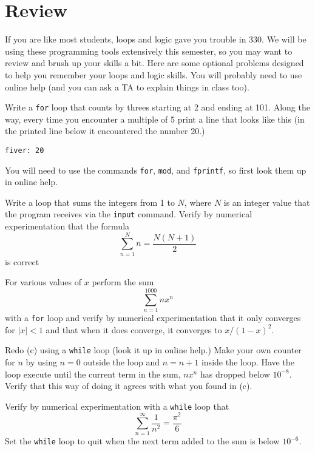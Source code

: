 \chapter*{Review}

If you are like most students, loops and logic gave you trouble in
330. We will be using these programming tools extensively this
semester, so you may want to review and brush up your skills a bit.
Here are some optional problems designed to help you remember your
loops and logic skills. You will probably need to use online help
(and you can ask a TA to explain things in class too).

\begin{enumerate}
\subprob {}  Write a {\tt for}
    loop that counts by threes starting at 2 and ending at 101.
    Along the way, every time you encounter a multiple of 5 print
    a line that looks like this (in the printed line below it
    encountered the number 20.)
\begin{Verbatim}
fiver: 20
\end{Verbatim}
    You will need to use the commands {\tt for}, {\tt mod}, and
    {\tt fprintf}, so first look them up in online help.

\subprob Write a loop that sums the integers from 1 to $N$, where
    $N$ is an integer value that the program receives via the
    {\tt input} command. Verify by numerical experimentation that
    the formula
    \[
        \sum_{n=1}^N n = \frac{N(N+1)}{2}
    \]
    is correct

\subprob For various values of $x$ perform the sum
    \[
        \sum_{n=1}^{1000} n x^n
    \]
    with a {\tt for} loop and verify by numerical experimentation
    that it only converges for $|x| < 1$ and that when it does
    converge, it converges to $x/(1-x)^2$.

 
\subprob Redo (c) using a {\tt while} loop (look it up in online
    help.) Make your own counter for $n$ by using $n=0$ outside
    the loop and $n=n+1$ inside the loop. Have the loop execute
    until the current term in the sum, $n x^n$ has dropped below
    $10^{-8}$. Verify that this way of doing it agrees with what
    you found in (c).

\subprob Verify by numerical experimentation with a {\tt while}
    loop that
    \[
        \sum_{n=1}^{\infty} \frac{1}{n^2} = \frac{\pi^2}{6}
    \]
    Set the {\tt while} loop to quit when the next term added to
    the sum is below $10^{-6}$.


\end{enumerate}
